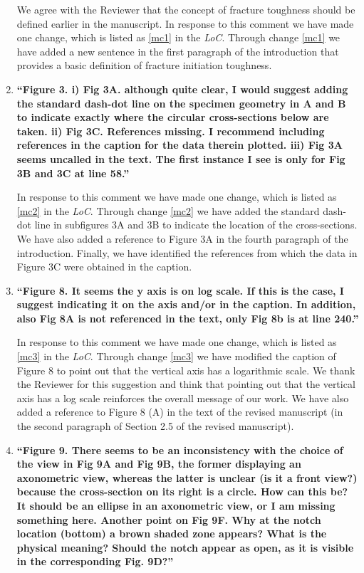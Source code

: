 \documentclass[11pt,letterpaper]{report}
\begin{document}
\begin{enumerate}[label=\textit{2.\arabic*},wide, labelwidth=!, labelindent=0pt]
We agree with the Reviewer that the concept of fracture toughness should be defined earlier in the manuscript. In response to this comment we have made one change, which is listed as \ref{mc1} in the \textit{LoC}.
%
Through change \ref{mc1} we have added a new sentence in the first paragraph of the introduction that provides a basic definition of fracture initiation toughness.
%

\item \label{r2c4} {\bf ``Figure 3. i) Fig 3A. although quite clear, I would suggest adding the standard dash-dot line on the specimen geometry in A and B to indicate exactly where the circular cross-sections below are taken. ii) Fig 3C. References missing. I recommend including references in the caption for the data therein plotted. iii) Fig 3A seems uncalled in the text. The first instance I see is only for Fig 3B and 3C at line 58.''}

In response to this comment we have made one change, which is listed as \ref{mc2} in the \textit{LoC}.
%
Through change \ref{mc2} we have added the standard dash-dot line in subfigures 3A and 3B to indicate the location of the cross-sections. We have also added a reference to Figure 3A in the fourth paragraph of the introduction. Finally, we have identified the references from which the data in Figure 3C were obtained in the caption.

\item \label{r2c5} {\bf ``Figure 8. It seems the y axis is on log scale. If this is the case, I suggest indicating it on the axis and/or in the caption. In addition, also Fig 8A is not referenced in the text, only Fig 8b is at line 240.''}

In response to this comment we have made one change, which is listed as \ref{mc3} in the \textit{LoC}.
%
Through change \ref{mc3} we have modified the caption of Figure 8 to point out that the vertical axis has a logarithmic scale. We thank the Reviewer for this suggestion and think that pointing out that the vertical axis has a log scale reinforces the overall message of our work. We have also added a reference to Figure 8 (A) in the text of the revised manuscript  (in the second paragraph of Section 2.5 of the revised manuscript).%

\item \label{r2c6} {\bf ``Figure 9. There seems to be an inconsistency with the choice of the view in Fig 9A and Fig 9B, the former displaying an axonometric view, whereas the latter is unclear (is it a front view?) because the cross-section on its right is a circle. How can this be? It should be an ellipse in an axonometric view, or I am missing something here. Another point on Fig 9F. Why at the notch location (bottom) a brown shaded zone appears? What is the physical meaning? Should the notch appear as open, as it is visible in the corresponding Fig. 9D?''}


\end{enumerate}
\end{document}
